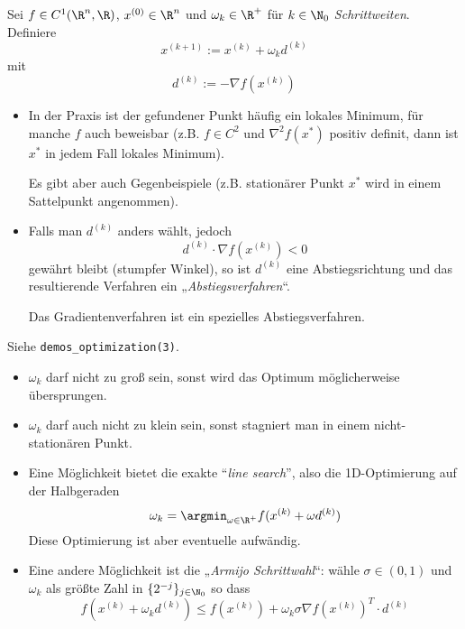 \documentclass[11pt]{scrartcl}
\begin{document}
\begin{df}[Gradientenverfahren] \label{4.6}
	Sei $f \in C^1(\R^n, \R)$, $x^{(0)} \in \R^n$ und $\omega_k \in \R^+$ für $k \in \N_0$ \emph{Schrittweiten}.
	Definiere
	\[
		x^{(k+1)} := x^{(k)} + \omega_k d^{(k)}
	\]
	mit
	\[
		d^{(k)} := - \nabla f(x^{(k)})
	\]
	\begin{note}[Optimalität]
		\begin{itemize}
			\item
				In der Praxis ist der gefundener Punkt häufig ein lokales Minimum, für manche $f$ auch beweisbar (z.B. $f \in C^2$ und $\nabla^2 f(x^*)$ positiv definit, dann ist $x^*$ in jedem Fall lokales Minimum).

				Es gibt aber auch Gegenbeispiele (z.B. stationärer Punkt $x^*$ wird in einem Sattelpunkt angenommen).
		\end{itemize}
	\end{note}
	\begin{note}[Abstiegsrichtung]
		\begin{itemize}
			\item
				Falls man $d^{(k)}$ anders wählt, jedoch
				\[
					d^{(k)} \cdot \nabla f(x^{(k)}) < 0
				\]
				gewährt bleibt (stumpfer Winkel), so ist $d^{(k)}$ eine Abstiegsrichtung und das resultierende Verfahren ein „\emph{Abstiegsverfahren}“.
				
				Das Gradientenverfahren ist ein spezielles Abstiegsverfahren.
		\end{itemize}
	\end{note}
	\begin{note}[Schrittweite]
		Siehe \verb|demos_optimization(3)|.
		\begin{itemize}
			\item
				$\omega_k$ darf nicht zu groß sein, sonst wird das Optimum möglicherweise übersprungen.
			\item
				$\omega_k$ darf auch nicht zu klein sein, sonst stagniert man in einem nicht-stationären Punkt.
			\item
				Eine Möglichkeit bietet die exakte “\emph{line search}”, also die 1D-Optimierung auf der Halbgeraden
				\[
					\omega_k = \argmin_{\omega \in \R^+} f(x^{(k)} + \omega d^{(k)})
				\]
				Diese Optimierung ist aber eventuelle aufwändig.
			\item
				Eine andere Möglichkeit ist die „\emph{Armijo Schrittwahl}“: wähle $\sigma \in (0,1)$ und $\omega_k$ als größte Zahl in $\{2^{-j}\}_{j\in \N_0}$ so dass
				\[
					f(x^{(k)} + \omega_k d^{(k)}) \le f(x^{(k)}) + \omega_k \sigma \nabla f(x^{(k)})^T \cdot d^{(k)}
				\]
		\end{itemize}
	\end{note}
\end{df}
\end{document}
